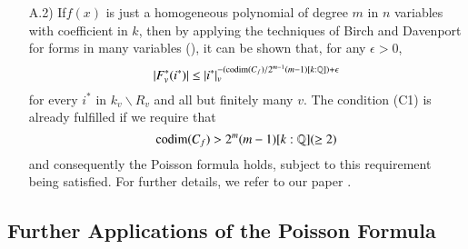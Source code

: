 \begin{itemize}
\item[A.2)] If\pageoriginale $f(x)$ is just a homogeneous polynomial
  of degree $m$ in $n$ variables with coefficient in $k$, then by
  applying the techniques of Birch and Davenport for forms in many
  variables (\cite{Bir}), it can be shown that, for any $\epsilon>0$,
  $$
  |F^{\ast}_{v}(i^{\ast})|\leq
  |i^{\ast}|_{v}^{-(\operatorname{codim}(C_{f})/2^{m-1}(m-1)[k:\mathbb{Q}])+\epsilon} 
  $$
  for every $i^{\ast}$ in $k_{v}\backslash R_{v}$ and all but finitely
  many $v$. The condition (C1) is already fulfilled if we require that
  $$
  \operatorname{codim}(C_{f})>2^{m}(m-1)[k:\mathbb{Q}](\geq 2)
  $$
  and consequently the Poisson formula holds, subject to this
  requirement being satisfied. For further details, we refer to our
  paper \cite{Igu 8}.
\end{itemize}


\subsection{Further Applications of the Poisson
  Formula}\label{chap4:sec2:subsec3}  %

